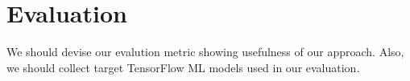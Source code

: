 \section{Evaluation}\label{sec:eval}
We should devise our evalution metric showing usefulness of our approach.
Also, we should collect target TensorFlow ML models used in our evaluation.
